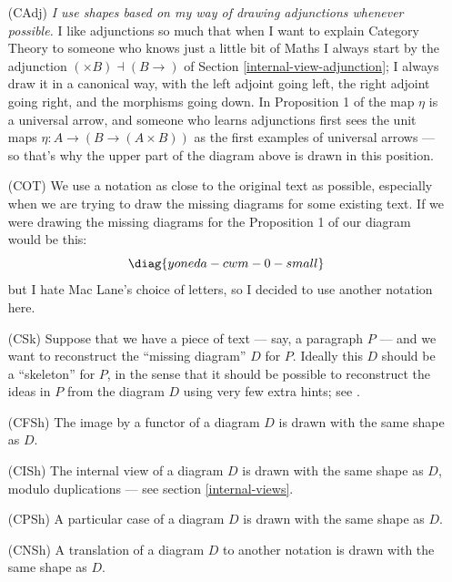 \documentclass[oneside,12pt]{article}
\begin{document}
\begin{itemize}
\item[(CAdj)] {\sl I use shapes based on my way of drawing adjunctions
  whenever possible.} I like adjunctions so much that when I want to
  explain Category Theory to someone who knows just a little bit of
  Maths I always start by the adjunction $({×}B)⊣(B{→})$ of Section
  \ref{internal-view-adjunction}; I always draw it in a canonical way,
  with the left adjoint going left, the right adjoint going right, and
  the morphisms going down. In Proposition 1 of \cite[Section
    III.2]{CWM2} the map $η$ is a universal arrow, and someone who
  learns adjunctions first sees the unit maps $η:A→(B{→}(A{×}B))$ as
  the first examples of universal arrows --- so that's why the upper
  part of the diagram above is drawn in this position.

\item[(COT)] We use a notation as close to the original text as
  possible, especially when we are trying to draw the missing diagrams
  for some existing text. If we were drawing the missing diagrams for
  the Proposition 1 of \cite[Section III.2]{CWM2} our diagram would be
  this:
%
$$\pu
  \diag{yoneda-cwm-0-small}
$$
%
but I hate Mac Lane's choice of letters, so I decided to use another
notation here.

\item[(CSk)] Suppose that we have a piece of text --- say, a paragraph
  $P$ --- and we want to reconstruct the ``missing diagram'' $D$ for
  $P$. Ideally this $D$ should be a ``skeleton'' for $P$, in the sense
  that it should be possible to reconstruct the ideas in $P$ from the
  diagram $D$ using very few extra hints; see \cite[sec.12]{IDARCT}.

\item[(CFSh)] The image by a functor of a diagram $D$ is drawn with
  the same shape as $D$.

\item[(CISh)] The internal view of a diagram $D$ is drawn with the
  same shape as $D$, modulo duplications --- see section
  \ref{internal-views}.

\item[(CPSh)] A particular case of a diagram $D$ is drawn with the
  same shape as $D$.

\item[(CNSh)] A translation of a diagram $D$ to another notation is
  drawn with the same shape as $D$.

\end{itemize}
\end{document}
